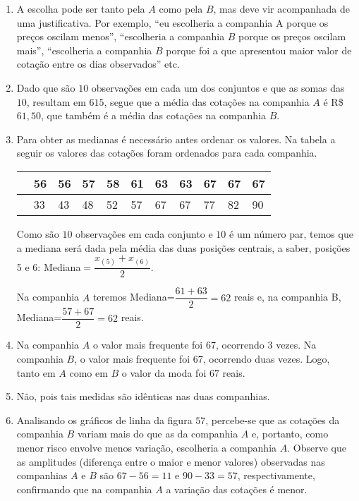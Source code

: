 \documentclass[10 pt,usenames,dvipsnames, oneside]{article}
\begin{document}
\ifdefined\prof
\begin{solucao}

\begin{enumerate}
\item A escolha pode ser tanto pela $A$ como pela $B$, mas deve vir acompanhada de uma justificativa. Por exemplo, “eu escolheria a companhia A porque os preços oscilam menos”, “escolheria a companhia $B$ porque os preços oscilam mais”, “escolheria a companhia $B$ porque foi a que apresentou maior valor de cotação entre os dias observados”{} etc.

\item Dado que são $10$ observações em cada um dos conjuntos e que as somas das $10$, resultam em $615$, segue que a média das cotações na companhia $A$ é R\$ $61{,}50$, que também é a média das cotações na companhia $B$.

\item Para obter as medianas é necessário antes ordenar os valores. Na tabela a seguir os valores das cotações foram ordenados para cada companhia.


\begin{table}[H]
\centering

\begin{tabular}{|*{11}{f|}}
\hline
{} & 56 & 56 & 57 & 58 & 61 & 63 & 63 & 67 & 67 & 67 \\
\hline
{} & 33 & 43 & 48 & 52 & 57 & 67 & 67 & 77 & 82 & 90 \\
\hline
\end{tabular}
\end{table}

Como são $10$ observações em cada conjunto e $10$ é um número par, temos que a mediana será dada pela média das duas posições centrais, a saber, posições 5 e 6: Mediana$=\dfrac{x_{(5)}+x_{(6)}}{2}$.

Na companhia $A$ teremos Mediana=$\dfrac{61+63}{2}=62$ reais e, na companhia B, Mediana=$\dfrac{57+67}{2}=62$ reais.

\item Na companhia $A$ o valor mais frequente foi $67$, ocorrendo $3$ vezes. Na companhia $B$, o valor mais frequente foi $67$, ocorrendo duas vezes. Logo, tanto em $A$ como em $B$ o valor da moda foi $67$ reais.

\item Não, pois tais medidas são idênticas nas duas companhias.

\item Analisando os gráficos de linha da figura $57$, percebe-se que as cotações da companhia $B$ variam mais do que as da companhia $A$ e, portanto, como menor risco envolve menos variação, escolheria a companhia $A$. Observe que as amplitudes (diferença entre o maior e menor valores) observadas nas companhias $A$ e $B$ são $67-56=11$ e $90-33=57$, respectivamente, confirmando que na companhia $A$ a variação das cotações é menor.
\end{enumerate}

\end{solucao}
\fi
\end{document}
